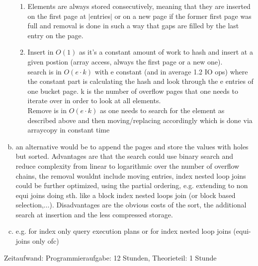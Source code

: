\documentclass[a4paper]{article}
\begin{document}
\begin{enumerate}[a.]
\begin{enumerate}
                \item
                    Elements are always stored consecutively, meaning that they are inserted on the first page at $|$entries$|$ or on a new page if the former first page was full
                    and removal is done in such a way that gaps are filled by the last entry on the page.
                \item Insert in $O(1)$ as it's a constant amount of work to hash and insert at a given postion (array access, always the first page or a new one). \\
                    search is in $O(e \cdot k)$ with e constant (and in average 1.2 IO ops) where the constant part is calculating the hash and look through the e entries of one bucket page.
                    k is the number of overflow pages that one needs to iterate over in order to look at all elements. \\
                    Remove is in $O(e \cdot k)$ as one needs to search for the element as described above and then moving/replacing accordingly which is done via arraycopy in constant time

            \end{enumerate}
        \item an alternative would be to append the pages and store the values with holes but sorted. Advantages are that the search could use binary search and reduce complexity from
            linear to logarithmic over the number of overflow chains, the removal wouldnt include moving entries, index nested loop joins could be further optimized, using the partial ordering, 
            e.g. extending to non equi joins doing sth. like a block index nested loops join (or block based selection,...).
            Disadvantages are the obvious costs of the sort, the additional search at insertion and the less compressed storage.
        \item e.g. for index only query execution plans or for index nested loop joins (equi-joins only ofc)
   \end{enumerate}

   Zeitaufwand: Programmieraufgabe: 12 Stunden, Theorieteil: 1 Stunde
\end{document}
